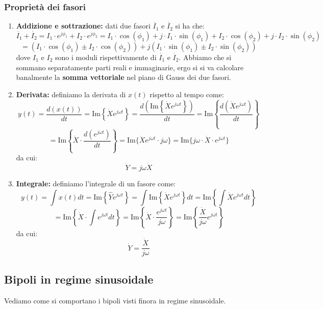 \documentclass[a4paper,11pt]{article}
\begin{document}
\subsubsection{Proprietà dei fasori}
\begin{enumerate}
	\item \textbf{Addizione e sottrazione:} dati due fasori $\dot{I_1}$ e $\dot{I_2}$ si ha che:
		$$
		\dot{I_1} + \dot{I_2} = I_1 \cdot e^{j\phi_1} + I_2 \cdot e^{j\phi_2} = I_1 \cdot \cos(\phi_1) + j \cdot I_1 \cdot \sin(\phi_1) + I_2 \cdot \cos(\phi_2) + j \cdot I_2 \cdot \sin(\phi_2)
		$$
		$$
		= \left( I_1 \cdot \cos(\phi_1) \pm I_2 \cdot \cos(\phi_2) \right) + j (I_1 \cdot \sin(\phi_1) \pm I_2 \cdot \sin(\phi_2))
		$$
		dove $I_1$ e $I_2$ sono i moduli rispettivamente di $\dot{I_1}$ e $\dot{I_2}$.
		Abbiamo che si sommano separatamente parti reali e immaginarie, ergo si si va calcolare banalmente la \textbf{somma vettoriale} nel piano di Gauss dei due fasori.
	\item \textbf{Derivata:} definiamo la derivata di $x(t)$ rispetto al tempo come:
		$$
		y(t) = \frac{d\left(x(t)\right)}{dt} = \mathrm{Im}\left\{ \dot{X} e^{j \omega t} \right\} = \frac{d\left( \mathrm{Im}\left\{\dot{X}e^{j\omega t}\right\} \right)}{dt} = \mathrm{Im}\left\{ \frac{d\left( \dot{X} e^{j\omega t} \right)}{dt} \right\} 
		$$
		$$
		= \mathrm{Im}\left\{ \dot{X} \cdot \frac{d \left( e^{j \omega t} \right)}{dt} \right\} = \mathrm{Im} \{ \dot{X} e^{j \omega t} \cdot j \omega \} = \mathrm{Im} \{ j\omega \cdot \dot{X} \cdot e^{j\omega t} \}
		$$
		da cui:
		$$
		\dot{Y} = j \omega \dot{X}
		$$
	\item \textbf{Integrale:} definiamo l'integrale di un fasore come:
		$$
		y(t) = \int x(t) dt = \mathrm{Im}\left\{ \hat{Y} e^{j\omega t} \right\} = \int \mathrm{Im} \left\{ \dot{X} e^{j\omega t} \right\} dt = \mathrm{Im} \left\{ \int \dot{X} e^{j \omega t} dt \right\} 
		$$
		$$
		= \mathrm{Im} \left\{ \dot{X} \cdot \int e^{j \omega t} dt \right\} = \mathrm{Im} \left\{ \dot{X} \cdot \frac{e^{j \omega t}}{j\omega} \right\} = \mathrm{Im}\left\{ \frac{\dot{X}}{j\omega} e^{j \omega t} \right\}
		$$
		da cui:
		$$
		\dot{Y} = \frac{\dot{X}}{j\omega}
		$$
\end{enumerate}

\subsection{Bipoli in regime sinusoidale}
Vediamo come si comportano i bipoli visti finora in regime sinusoidale.
\end{document}
